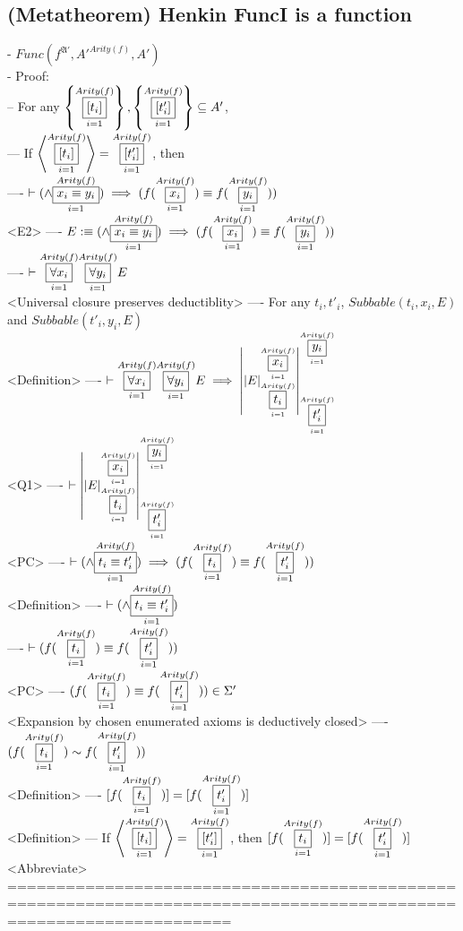 \documentclass{book}
\newcommand{\is}{:\equiv}
\newcommand{\means}[2]{#1^{#2}}
\newcommand{\set}[1]{\left\{ #1 \right\}}
\newcommand{\seq}[1]{\left\langle #1 \right\rangle}
\newcommand{\vdc}[3]{\underset{#2}{\overset{#3}{\fbox{$#1$}}}}
\newcommand{\sub}[3]{\left|#1\right|_{#3}^{#2}}
\begin{document}
\subsection{(Metatheorem) Henkin FuncI is a function} %
	- $Func(\means{f}{\mathfrak{A}'}, A'^{Arity(f)}, A')$ \\
	- Proof: \\
		-- For any $\set{\vdc{[t_i]}{i=1}{Arity(f)}}, \set{\vdc{[t'_i]}{i=1}{Arity(f)}} \subseteq A'$, \\
			--- If $\seq{\vdc{[t_i]}{i=1}{Arity(f)}} = \vdc{[t'_i]}{i=1}{Arity(f)}$, then \\
				---- $\vdash (\land \vdc{x_i \equiv y_i}{i=1}{Arity(f)}) \implies (f(\vdc{x_i}{i=1}{Arity(f)}) \equiv f(\vdc{y_i}{i=1}{Arity(f)}))$ \\ <E2>
				---- $E \is (\land \vdc{x_i \equiv y_i}{i=1}{Arity(f)}) \implies (f(\vdc{x_i}{i=1}{Arity(f)}) \equiv f(\vdc{y_i}{i=1}{Arity(f)}))$ \\
				---- $\vdash \vdc{\forall x_i}{i=1}{Arity(f)} \vdc{\forall y_i}{i=1}{Arity(f)} E$ \\ <Universal closure preserves deductiblity>
				---- For any $t_i, t'_i$, $Subbable(t_i, x_i, E)$ and $Subbable(t'_i, y_i, E)$ \\ <Definition>
				---- $\vdash \vdc{\forall x_i}{i=1}{Arity(f)} \vdc{\forall y_i}{i=1}{Arity(f)} E \implies \sub{\sub{E}{\vdc{x_i}{i=1}{Arity(f)}}{\vdc{t_i}{i=1}{Arity(f)}}}{\vdc{y_i}{i=1}{Arity(f)}}{\vdc{t'_i}{i=1}{Arity(f)}}$ \\ <Q1>
				---- $\vdash \sub{\sub{E}{\vdc{x_i}{i=1}{Arity(f)}}{\vdc{t_i}{i=1}{Arity(f)}}}{\vdc{y_i}{i=1}{Arity(f)}}{\vdc{t'_i}{i=1}{Arity(f)}}$ \\ <PC>
				---- $\vdash (\land \vdc{t_i \equiv t'_i}{i=1}{Arity(f)}) \implies (f(\vdc{t_i}{i=1}{Arity(f)}) \equiv f(\vdc{t'_i}{i=1}{Arity(f)}))$ \\ <Definition>
				---- $\vdash (\land \vdc{t_i \equiv t'_i}{i=1}{Arity(f)})$ \\
				---- $\vdash (f(\vdc{t_i}{i=1}{Arity(f)}) \equiv f(\vdc{t'_i}{i=1}{Arity(f)}))$ \\ <PC>
				---- $(f(\vdc{t_i}{i=1}{Arity(f)}) \equiv f(\vdc{t'_i}{i=1}{Arity(f)})) \in \Sigma'$ \\ <Expansion by chosen enumerated axioms is deductively closed>
				---- $(f(\vdc{t_i}{i=1}{Arity(f)}) \sim f(\vdc{t'_i}{i=1}{Arity(f)}))$ \\ <Definition>
				---- $[f(\vdc{t_i}{i=1}{Arity(f)})] = [f(\vdc{t'_i}{i=1}{Arity(f)})]$ \\ <Definition>
			--- If $\seq{\vdc{[t_i]}{i=1}{Arity(f)}} = \vdc{[t'_i]}{i=1}{Arity(f)}$, then $[f(\vdc{t_i}{i=1}{Arity(f)})] = [f(\vdc{t'_i}{i=1}{Arity(f)})]$ \\ <Abbreviate>
	===================================================================================================================
\end{document}
